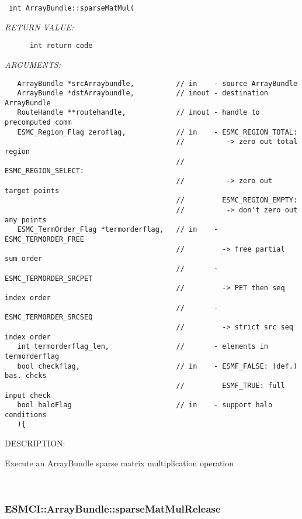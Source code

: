   
\begin{verbatim} int ArrayBundle::sparseMatMul(\end{verbatim}{\em RETURN VALUE:}
\begin{verbatim}      int return code\end{verbatim}{\em ARGUMENTS:}
\begin{verbatim}   ArrayBundle *srcArraybundle,          // in    - source ArrayBundle
   ArrayBundle *dstArraybundle,          // inout - destination ArrayBundle
   RouteHandle **routehandle,            // inout - handle to precomputed comm
   ESMC_Region_Flag zeroflag,            // in    - ESMC_REGION_TOTAL:
                                         //          -> zero out total region
                                         //         ESMC_REGION_SELECT:
                                         //          -> zero out target points
                                         //         ESMC_REGION_EMPTY:
                                         //          -> don't zero out any points
   ESMC_TermOrder_Flag *termorderflag,   // in    - ESMC_TERMORDER_FREE
                                         //         -> free partial sum order
                                         //       - ESMC_TERMORDER_SRCPET
                                         //         -> PET then seq index order
                                         //       - ESMC_TERMORDER_SRCSEQ
                                         //         -> strict src seq index order
   int termorderflag_len,                //       - elements in termorderflag
   bool checkflag,                       // in    - ESMF_FALSE: (def.) bas. chcks
                                         //         ESMF_TRUE: full input check
   bool haloFlag                         // in    - support halo conditions
   ){    \end{verbatim}
{\sf DESCRIPTION:\\ }


      Execute an ArrayBundle sparse matrix multiplication operation
   
 
\mbox{}\hrulefill\
 
\subsubsection [ESMCI::ArrayBundle::sparseMatMulRelease] {ESMCI::ArrayBundle::sparseMatMulRelease}


